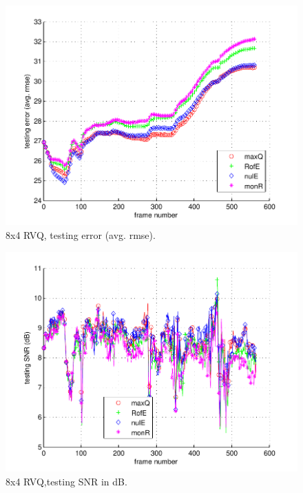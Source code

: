 								\begin{figure}[h!]
								\centering
								\includegraphics[height=0.4\textheight]{thesis/1_Dudek_8_4_1000_tst_armse.pdf}
								\caption{8x4 RVQ, testing error (avg. rmse).}
								\label{fig:1_Dudek_8_4_1000_tst_armse}
								\end{figure}

								\begin{figure}[h!]
								\centering
								\includegraphics[height=0.4\textheight]{thesis/1_Dudek_8_4_1000_tst_SNRdB.pdf}
								\caption{8x4 RVQ,testing SNR in dB.}
								\label{fig:1_Dudek_8_4_1000_tst_SNRdB}
								\end{figure}